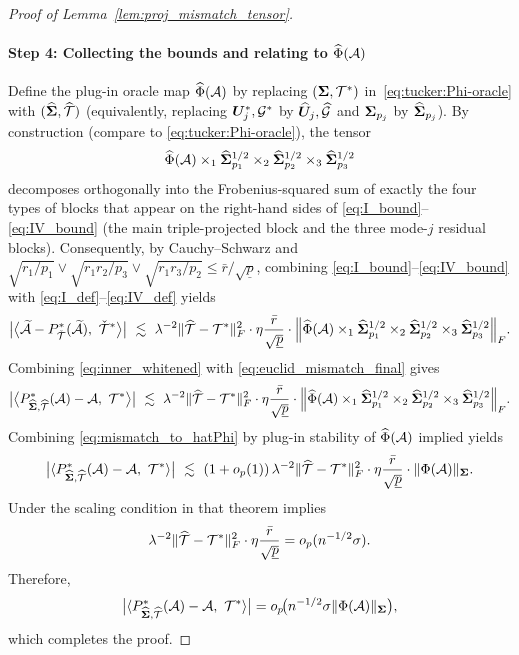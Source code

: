 \documentclass[authoryear,preprint,review,12pt]{elsarticle}
\begin{document}
{\begin{proof}[Proof of Lemma~\ref{lem:proj_mismatch_tensor}]
		\paragraph{Step 4: Collecting the bounds and relating to $\widehat{\Phi}(\mathcal{A})$}
		Define the plug-in oracle map $\widehat{\Phi}(\mathcal{A})$ by replacing $(\mathbf{ \Sigma},\mathcal{T}^\ast)$ in~\eqref{eq:tucker:Phi-oracle}
		with $(\widehat{\mathbf{ \Sigma}},\widehat{\mathcal{T}})$ (equivalently, replacing $\boldsymbol U_j^\ast,\mathcal G^\ast$ by $\widehat{\boldsymbol U}_j,\widehat{\mathcal G}$
		and $\mathbf{ \Sigma}_{p_j}$ by $\widehat{\mathbf{ \Sigma}}_{p_j}$).
		By construction (compare to \eqref{eq:tucker:Phi-oracle}), the tensor
		\[
		\widehat{\Phi}(\mathcal{A})\times_1\widehat{\mathbf{ \Sigma}}_{p_1}^{1/2}\times_2\widehat{\mathbf{ \Sigma}}_{p_2}^{1/2}\times_3\widehat{\mathbf{ \Sigma}}_{p_3}^{1/2}
		\]
		decomposes orthogonally into the Frobenius-squared sum of exactly the four types of blocks that appear on the right-hand sides of
		\eqref{eq:I_bound}--\eqref{eq:IV_bound} (the main triple-projected block and the three mode-$j$ residual blocks).
		Consequently, by Cauchy--Schwarz and $\sqrt{r_1/p_1}\vee \sqrt{r_1r_2/p_3}\vee\sqrt{r_1r_3/p_2}\le \bar r/\sqrt{\underline p}$,
		combining \eqref{eq:I_bound}--\eqref{eq:IV_bound} with \eqref{eq:I_def}--\eqref{eq:IV_def} yields
		\begin{equation}\label{eq:euclid_mismatch_final}
			\big|\big\langle \widetilde{\mA}-P_{\check{\mT}}^\ast(\widetilde{\mA}),\ \check{\mT}^\ast\big\rangle\big|
			\ \lesssim\
			\lambda^{-2}\|\widehat{\mT}-\mT^\ast\|_F^2\cdot \eta\frac{\bar r}{\sqrt{\underline p}}\cdot
			\Big\|\widehat{\Phi}(\mA)\times_1\widehat{\bSigma}_{p_1}^{1/2}\times_2\widehat{\bSigma}_{p_2}^{1/2}\times_3\widehat{\bSigma}_{p_3}^{1/2}\Big\|_F.
		\end{equation}
		Combining \eqref{eq:inner_whitened} with \eqref{eq:euclid_mismatch_final} gives
		\begin{equation}\label{eq:mismatch_to_hatPhi}
			\big|\big\langle P_{\widehat{\bSigma},\widehat{\mT}}^\ast(\mA)-\mA,\ \mT^\ast\big\rangle\big|
			\ \lesssim\
			\lambda^{-2}\|\widehat{\mT}-\mT^\ast\|_F^2\cdot \eta\frac{\bar r}{\sqrt{\underline p}}\cdot
			\Big\|\widehat{\Phi}(\mA)\times_1\widehat{\bSigma}_{p_1}^{1/2}\times_2\widehat{\bSigma}_{p_2}^{1/2}\times_3\widehat{\bSigma}_{p_3}^{1/2}\Big\|_F.
		\end{equation}
		Combining \eqref{eq:mismatch_to_hatPhi} by plug-in stability of $\widehat\Phi(\mathcal{A})$ implied yields
		\[
		\big|\langle P_{\widehat{\mathbf{ \Sigma}},\widehat{\mathcal{T}}}^\ast(\mathcal{A})-\mathcal{A},\ \mathcal{T}^\ast\rangle\big|
		\ \lesssim\
		(1+o_p(1))\,
		\lambda^{-2}\|\widehat{\mathcal{T}}-\mathcal{T}^\ast\|_F^2\cdot \eta\frac{\bar r}{\sqrt{\underline p}}\cdot
		\|\Phi(\mathcal{A})\|_{\mathbf{ \Sigma}}.
		\]
		Under the scaling condition in that theorem implies
		\[
		\lambda^{-2}\|\widehat{\mathcal{T}}-\mathcal{T}^\ast\|_F^2\cdot \eta\frac{\bar r}{\sqrt{\underline p}}
		=
		o_p(n^{-1/2}\sigma).
		\]
		Therefore,
		\[
		\big|\langle P_{\widehat{\mathbf{ \Sigma}},\widehat{\mathcal{T}}}^\ast(\mathcal{A})-\mathcal{A},\ \mathcal{T}^\ast\rangle\big|
		=
		o_p\!\big(n^{-1/2}\sigma\|\Phi(\mathcal{A})\|_{\mathbf{ \Sigma}}\big),
		\]
		which completes the proof.
	\end{proof}
	
}
\end{document}
